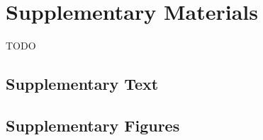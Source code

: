 \documentclass[smallextended]{svjour3}
\begin{document}
\section*{Supplementary Materials}
TODO

\subsection*{Supplementary Text}\label{ss:supp}




\subsection*{Supplementary Figures}\label{ss:sfig}
\end{document}

